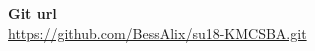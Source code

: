 \documentclass[a4paper]{article}
\begin{document}
\maketitle

\textbf{Git url}\\
\url{https://github.com/BessAlix/su18-KMCSBA.git}

\newpage
















\end{document}
